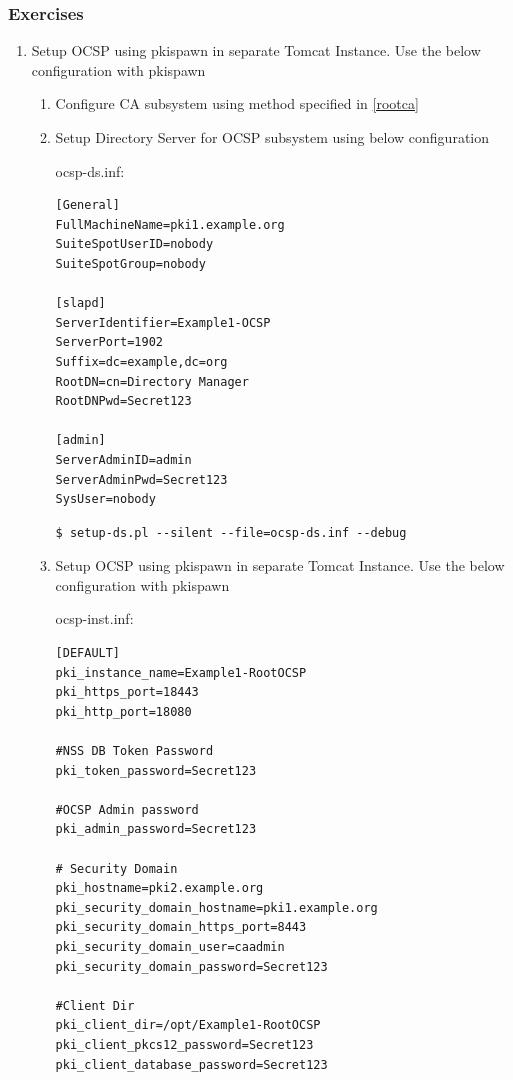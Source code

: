 \documentclass[12pt]{report}
\begin{document}
\subsubsection{Exercises}
    \begin{enumerate}[label*=\arabic*.]
        \item Setup OCSP using pkispawn in separate Tomcat Instance. Use the below configuration with pkispawn
            \begin{enumerate}[label*=\arabic*.]
                \item Configure CA subsystem using method specified in \ref{rootca}
                \item Setup Directory Server for OCSP subsystem using below configuration 

                ocsp-ds.inf:
                    \begin{lstlisting}[style=configFile]
[General]
FullMachineName=pki1.example.org
SuiteSpotUserID=nobody
SuiteSpotGroup=nobody

[slapd]
ServerIdentifier=Example1-OCSP
ServerPort=1902
Suffix=dc=example,dc=org
RootDN=cn=Directory Manager
RootDNPwd=Secret123

[admin]
ServerAdminID=admin
ServerAdminPwd=Secret123
SysUser=nobody
                    \end{lstlisting}
                    \begin{lstlisting}[style=bashInputStyle]
$ setup-ds.pl --silent --file=ocsp-ds.inf --debug                
                    \end{lstlisting}
                \item \label{ocsp_sep_tomcat} Setup OCSP using pkispawn in separate Tomcat Instance. Use the below configuration with pkispawn

                    ocsp-inst.inf:
                    \begin{lstlisting}[style=configFile]
[DEFAULT]
pki_instance_name=Example1-RootOCSP
pki_https_port=18443
pki_http_port=18080

#NSS DB Token Password
pki_token_password=Secret123

#OCSP Admin password
pki_admin_password=Secret123

# Security Domain
pki_hostname=pki2.example.org
pki_security_domain_hostname=pki1.example.org
pki_security_domain_https_port=8443
pki_security_domain_user=caadmin
pki_security_domain_password=Secret123

#Client Dir
pki_client_dir=/opt/Example1-RootOCSP
pki_client_pkcs12_password=Secret123
pki_client_database_password=Secret123


\end{lstlisting}
\end{enumerate}
\end{enumerate}
\end{document}
